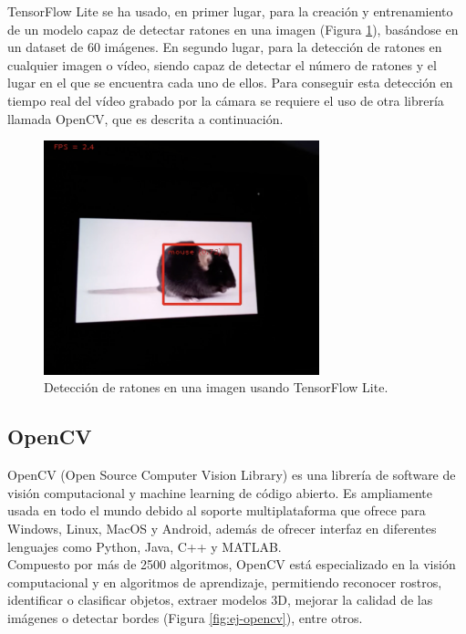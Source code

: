 TensorFlow Lite se ha usado, en primer lugar, para la creación y entrenamiento de un modelo capaz de detectar ratones en una imagen (Figura \ref{fig:raton}), basándose en un dataset de 60 imágenes. En segundo lugar, para la detección de ratones en cualquier imagen o vídeo, siendo capaz de detectar el número de ratones y el lugar en el que se encuentra cada uno de ellos. Para conseguir esta detección en tiempo real del vídeo grabado por la cámara se requiere el uso de otra librería llamada OpenCV, que es descrita a continuación.\\
\begin{figure} [h!]
  \begin{center}
    \includegraphics[width=8cm]{figs/raton-detectado}
  \end{center}
  \caption{Detección de ratones en una imagen usando TensorFlow Lite.}
  \label{fig:raton}
\end{figure}

\subsection{OpenCV}
\label{sec:opencv}
OpenCV (Open Source Computer Vision Library) es una librería de software de visión computacional y machine learning de código abierto. Es ampliamente usada en todo el mundo debido al soporte multiplataforma que ofrece para Windows, Linux, MacOS y Android, además de ofrecer interfaz en diferentes lenguajes como Python, Java, C++ y MATLAB.\\

Compuesto por más de 2500 algoritmos, OpenCV está especializado en la visión computacional y en algoritmos de aprendizaje, permitiendo reconocer rostros, identificar o clasificar objetos, extraer modelos 3D, mejorar la calidad de las imágenes o detectar bordes (Figura \ref{fig:ej-opencv}), entre otros.\\


